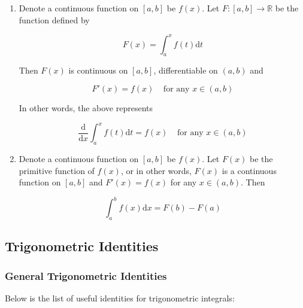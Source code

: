 \documentclass[a4paper,12pt]{article}
\newcommand{\s}{\vspace{1mm}}
\newcommand{\R}{\mathbb{R}}
\newcommand{\diff}{\mathrm{d}}
\newenvironment{alist}{ %
\begin{enumerate}[label=(\alph*)]
}{
\end{enumerate}
}
\begin{document}
\begin{alist}
  \item Denote a continuous function on $[a,b]$ be $f(x)$. Let $F:[a,b]\to\R$ be the function defined by

  $$F(x)=\int_{a}^{x}f(t)\diff t$$\s

  Then $F(x)$ is continuous on $[a,b]$, differentiable on $(a,b)$ and

  $$F'(x)=f(x)\;\;\;\;\text{for any }x\in(a,b)$$\s

  In other words, the above represents

  $$\frac{\diff }{\diff  x}\int_{a}^{x}f(t)\diff t=f(x)\;\;\;\;\text{for any }x\in(a,b)$$

  \item Denote a continuous function on $[a,b]$ be $f(x)$. Let $F(x)$ be the primitive function of $f(x)$, or in other words, $F(x)$ is a continuous function on $[a,b]$ and $F'(x)=f(x)$ for any $x\in(a,b)$. Then

  $$\int_{a}^{b}f(x)\diff x=F(b)-F(a)$$
\end{alist}

\subsection{Trigonometric Identities}
\subsubsection{General Trigonometric Identities}
Below is the list of useful identities for trigonometric integrals:
\end{document}
